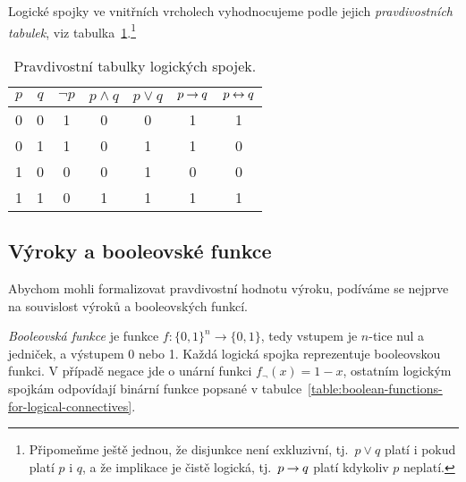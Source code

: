 Logické spojky ve vnitřních vrcholech vyhodnocujeme podle jejich \emph{pravdivostních tabulek}, viz tabulka~\ref{table:logical-connectives}.\footnote{Připomeňme ještě jednou, že disjunkce není exkluzivní, tj.\ $p\lor q$ platí i pokud platí $p$ i $q$, a že implikace je čistě logická, tj.\ $p\mathbin{\rightarrow} q$ platí kdykoliv $p$ neplatí.}

\begin{table}[htbp]
    \centering
    \begin{tabular}{@{}cc|ccccc@{}}
        \toprule
        $p$ & $q$ & $\neg p$ & $p\land q$ & $p\lor q$ & $p\mathbin{\rightarrow} q$ & $p\mathbin{\leftrightarrow} q$ \\ \midrule
        0   & 0   & 1        & 0          & 0         & 1          & 1          \\
        0   & 1   & 1        & 0          & 1         & 1          & 0          \\
        1   & 0   & 0        & 0          & 1         & 0          & 0          \\
        1   & 1   & 0        & 1          & 1         & 1          & 1          \\ \bottomrule
    \end{tabular}
    \caption{Pravdivostní tabulky logických spojek.}
    \label{table:logical-connectives}
\end{table}


\subsection{Výroky a booleovské funkce}

Abychom mohli formalizovat pravdivostní hodnotu výroku, podíváme se nejprve na souvislost výroků a booleovských funkcí. 

\emph{Booleovská funkce} je funkce $f\colon\{0,1\}^n\to\{0,1\}$, tedy vstupem je $n$-tice nul a jedniček, a výstupem 0 nebo 1. Každá logická spojka reprezentuje booleovskou funkci. V případě negace jde o unární funkci $f_\neg(x)=1-x$, ostatním logickým spojkám odpovídají binární funkce popsané v tabulce~\ref{table:boolean-functions-for-logical-connectives}.


